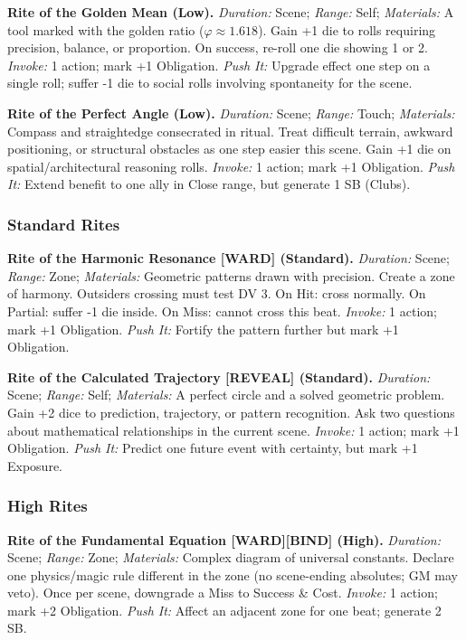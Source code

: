 \textbf{Rite of the Golden Mean (Low).}  
\emph{Duration:} Scene; \emph{Range:} Self; \emph{Materials:} A tool marked with the golden ratio ($\varphi \approx 1.618$).  
Gain +1 die to rolls requiring precision, balance, or proportion. On success, re-roll one die showing 1 or 2.  
\emph{Invoke:} 1 action; mark +1 Obligation.  
\emph{Push It:} Upgrade effect one step on a single roll; suffer -1 die to social rolls involving spontaneity for the scene.

\textbf{Rite of the Perfect Angle (Low).}  
\emph{Duration:} Scene; \emph{Range:} Touch; \emph{Materials:} Compass and straightedge consecrated in ritual.  
Treat difficult terrain, awkward positioning, or structural obstacles as one step easier this scene. Gain +1 die on spatial/architectural reasoning rolls.  
\emph{Invoke:} 1 action; mark +1 Obligation.  
\emph{Push It:} Extend benefit to one ally in Close range, but generate 1 SB (Clubs).

\subsubsection*{Standard Rites}

\textbf{Rite of the Harmonic Resonance [WARD] (Standard).}  
\emph{Duration:} Scene; \emph{Range:} Zone; \emph{Materials:} Geometric patterns drawn with precision.  
Create a zone of harmony. Outsiders crossing must test DV 3. On Hit: cross normally. On Partial: suffer -1 die inside. On Miss: cannot cross this beat.  
\emph{Invoke:} 1 action; mark +1 Obligation.  
\emph{Push It:} Fortify the pattern further but mark +1 Obligation.

\textbf{Rite of the Calculated Trajectory [REVEAL] (Standard).}  
\emph{Duration:} Scene; \emph{Range:} Self; \emph{Materials:} A perfect circle and a solved geometric problem.  
Gain +2 dice to prediction, trajectory, or pattern recognition. Ask two questions about mathematical relationships in the current scene.  
\emph{Invoke:} 1 action; mark +1 Obligation.  
\emph{Push It:} Predict one future event with certainty, but mark +1 Exposure.

\subsubsection*{High Rites}

\textbf{Rite of the Fundamental Equation [WARD][BIND] (High).}  
\emph{Duration:} Scene; \emph{Range:} Zone; \emph{Materials:} Complex diagram of universal constants.  
Declare one physics/magic rule different in the zone (no scene-ending absolutes; GM may veto). Once per scene, downgrade a Miss to Success \& Cost.  
\emph{Invoke:} 1 action; mark +2 Obligation.  
\emph{Push It:} Affect an adjacent zone for one beat; generate 2 SB.

